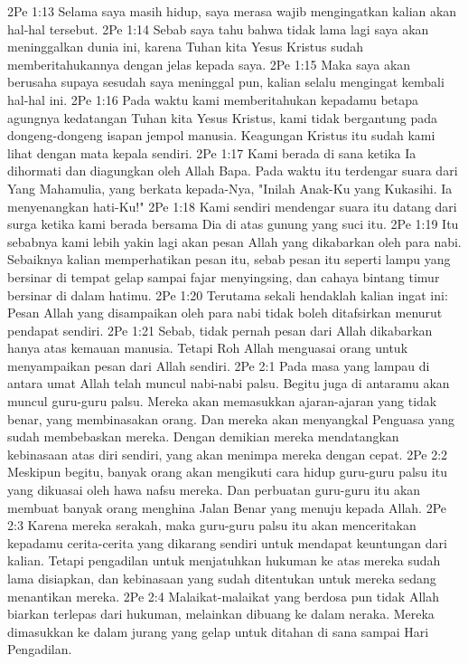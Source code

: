 2Pe 1:13  Selama saya masih hidup, saya merasa wajib mengingatkan kalian akan hal-hal tersebut.
2Pe 1:14  Sebab saya tahu bahwa tidak lama lagi saya akan meninggalkan dunia ini, karena Tuhan kita Yesus Kristus sudah memberitahukannya dengan jelas kepada saya.
2Pe 1:15  Maka saya akan berusaha supaya sesudah saya meninggal pun, kalian selalu mengingat kembali hal-hal ini.
2Pe 1:16  Pada waktu kami memberitahukan kepadamu betapa agungnya kedatangan Tuhan kita Yesus Kristus, kami tidak bergantung pada dongeng-dongeng isapan jempol manusia. Keagungan Kristus itu sudah kami lihat dengan mata kepala sendiri.
2Pe 1:17  Kami berada di sana ketika Ia dihormati dan diagungkan oleh Allah Bapa. Pada waktu itu terdengar suara dari Yang Mahamulia, yang berkata kepada-Nya, "Inilah Anak-Ku yang Kukasihi. Ia menyenangkan hati-Ku!"
2Pe 1:18  Kami sendiri mendengar suara itu datang dari surga ketika kami berada bersama Dia di atas gunung yang suci itu.
2Pe 1:19  Itu sebabnya kami lebih yakin lagi akan pesan Allah yang dikabarkan oleh para nabi. Sebaiknya kalian memperhatikan pesan itu, sebab pesan itu seperti lampu yang bersinar di tempat gelap sampai fajar menyingsing, dan cahaya bintang timur bersinar di dalam hatimu.
2Pe 1:20  Terutama sekali hendaklah kalian ingat ini: Pesan Allah yang disampaikan oleh para nabi tidak boleh ditafsirkan menurut pendapat sendiri.
2Pe 1:21  Sebab, tidak pernah pesan dari Allah dikabarkan hanya atas kemauan manusia. Tetapi Roh Allah menguasai orang untuk menyampaikan pesan dari Allah sendiri.
2Pe 2:1  Pada masa yang lampau di antara umat Allah telah muncul nabi-nabi palsu. Begitu juga di antaramu akan muncul guru-guru palsu. Mereka akan memasukkan ajaran-ajaran yang tidak benar, yang membinasakan orang. Dan mereka akan menyangkal Penguasa yang sudah membebaskan mereka. Dengan demikian mereka mendatangkan kebinasaan atas diri sendiri, yang akan menimpa mereka dengan cepat.
2Pe 2:2  Meskipun begitu, banyak orang akan mengikuti cara hidup guru-guru palsu itu yang dikuasai oleh hawa nafsu mereka. Dan perbuatan guru-guru itu akan membuat banyak orang menghina Jalan Benar yang menuju kepada Allah.
2Pe 2:3  Karena mereka serakah, maka guru-guru palsu itu akan menceritakan kepadamu cerita-cerita yang dikarang sendiri untuk mendapat keuntungan dari kalian. Tetapi pengadilan untuk menjatuhkan hukuman ke atas mereka sudah lama disiapkan, dan kebinasaan yang sudah ditentukan untuk mereka sedang menantikan mereka.
2Pe 2:4  Malaikat-malaikat yang berdosa pun tidak Allah biarkan terlepas dari hukuman, melainkan dibuang ke dalam neraka. Mereka dimasukkan ke dalam jurang yang gelap untuk ditahan di sana sampai Hari Pengadilan.
